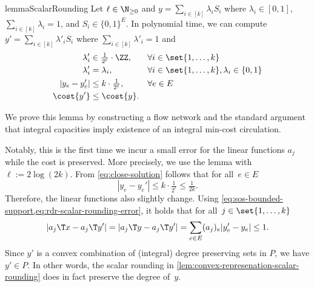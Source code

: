 \begin{restatable}{lemma}{ScalarRounding}
    \label{lem:convex-represenation-scalar-rounding}
    Let $\ell\in\N_{\ge 0}$ 
    and $y = \sum_{i \in [k]} \lambda_i S_i$ where $\lambda_i \in [0,1]$, $\sum_{i \in [k]} \lambda_i = 1$, and $S_i \in \{0,1\}^E$.
    In polynomial time, we can compute $y' = \sum_{i \in [k]} \lambda'_i S_i$ where $\sum_{i \in [k]} \lambda'_i = 1$ and
    \begin{align}
        \lambda'_i &\in \tfrac{1}{2^{\ell}}\cdot \ZZ, &&  \forall i \in \set{1, \dotsc, k} \label{eq:integer-multiples}\\
        \lambda'_i &= \lambda_i, &&  \forall i \in \set{1, \dotsc, k}, \lambda_i\in\{0,1\} \\
        |y_e - y_e'| &\le k \cdot \tfrac{1}{2^\ell}, &&  \forall e \in E \label{eq:close-solution}\\
        \cost{y'} &\le \cost{y}. \label{eq:rounding-cost-preservation}
    \end{align}
\end{restatable}
We prove this lemma by constructing a flow network and
the standard argument that integral capacities imply existence of an integral min-cost circulation.

Notably, this is the first time we incur a small error for the linear functions $a_j$ while the cost is preserved.
More precisely, we use the lemma with 
$\ell := 2\log(2k)$. From \cref{eq:close-solution} follows that for all~$e \in E$
\begin{equation}
    \label{eq:rdr-scalar-rounding-error}
    |y_e - y_e'| \le k \cdot \tfrac{1}{2^\ell} \le \tfrac{1}{2k}.
\end{equation} 
Therefore, the linear functions also slightly change.
Using \cref{eq:sos-bounded-support,eq:rdr-scalar-rounding-error}, it holds that for all~$j\in \set{1,\dotsc,k}$
\begin{equation}
    \label{eq:rdr-increase-in-linear-function}
    |a_j\T x - a_j\T y'| = |a_j\T y - a_j\T y'| = \sum_{e \in E} (a_j)_e | y_e' - y_e | \le 1.
\end{equation} 
Since $y'$ is a convex combination of (integral)
degree preserving sets in $P$, we have $y'\in P$. In other words, the scalar rounding in \cref{lem:convex-represenation-scalar-rounding} does in fact preserve the degree of~$y$. 

